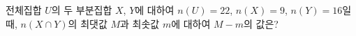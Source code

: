 전체집합 $U$의 두 부분집합 $X$, $Y$에 대하여 $n(U)=22$, $n(X)=9$, $n(Y)=16$일 때, $n(X\cap Y)$의 최댓값 $M$과 최솟값 $m$에 대하여 $M-m$의 값은?
